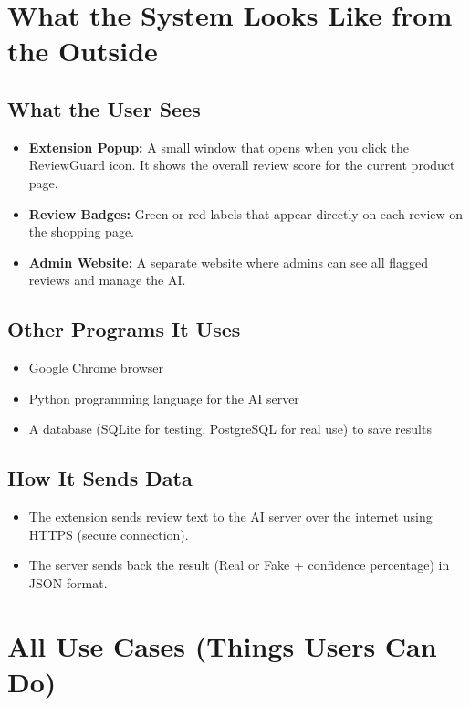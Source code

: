 \documentclass[10pt, a4paper]{report}
\begin{document}
\section{What the System Looks Like from the Outside}

\subsection{What the User Sees}

\begin{itemize}
  \item \textbf{Extension Popup:} A small window that opens when you click the ReviewGuard icon. It shows the overall review score for the current product page.
  \item \textbf{Review Badges:} Green or red labels that appear directly on each review on the shopping page.
  \item \textbf{Admin Website:} A separate website where admins can see all flagged reviews and manage the AI.
\end{itemize}

\subsection{Other Programs It Uses}
\begin{itemize}
  \item Google Chrome browser
  \item Python programming language for the AI server
  \item A database (SQLite for testing, PostgreSQL for real use) to save results
\end{itemize}

\subsection{How It Sends Data}
\begin{itemize}
  \item The extension sends review text to the AI server over the internet using HTTPS (secure connection).
  \item The server sends back the result (Real or Fake + confidence percentage) in JSON format.
\end{itemize}

\section{All Use Cases (Things Users Can Do)}
\end{document}

